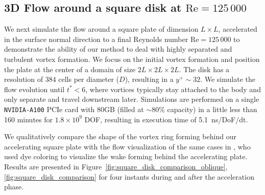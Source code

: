 \documentclass[final,1p,times]{elsarticle}
\begin{document}
\subsection{3D Flow around a square disk at $\text{Re}=125\,000$}

We next simulate the flow around a square plate of dimension $L\times L$, accelerated in the surface normal direction to a final Reynolds number $\text{Re}=125\,000$ to demonstrate the ability of our method to deal with highly separated and turbulent vortex formation. We focus on the initial vortex formation and position the plate at the center of a domain of size $2L\times2L\times2L$. The disk has a resolution of 384 cells per diameter ($D$), resulting in a $y^+\sim 32$. We simulate the flow evolution until $t^*<6$, where vortices typically stay attached to the body and only separate and travel downstream later. Simulations are performed on a single \texttt{NVIDIA-A100} PCIe card with 80GB (filled at $\sim80\%$ capacity) in a little less than 160 minutes for $1.8\times10^9$ DOF, resulting in execution time of 5.1~ns/DoF/dt.


We qualitatively compare the shape of the vortex ring forming behind our accelerating square plate with the flow visualization of the same cases in \cite{Higuchi1996Three-dimensionalPlates}, who used dye coloring to visualize the wake forming behind the accelerating plate. Results are presented in Figure~\ref{fig:square_disk_comparison_oblique}, \ref{fig:square_disk_comparison} for four instants during and after the acceleration phase. 
\end{document}
